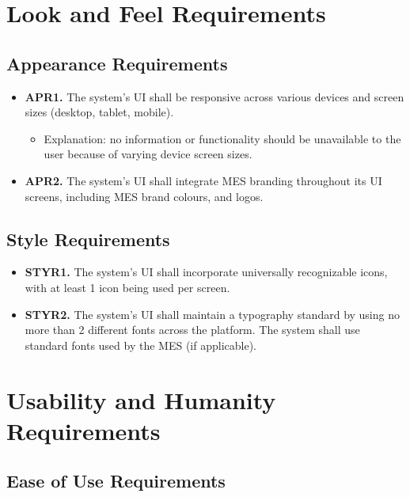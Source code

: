 \documentclass[12pt]{article}
\begin{document}
\section{Look and Feel Requirements}

\label{LookAndFeel}

\subsection{Appearance Requirements}

\label{APR}

\begin{itemize}
    \item \textbf{APR1.} The system's UI shall be responsive across various devices and screen sizes (desktop, tablet, mobile).
    \begin{itemize}
        \item Explanation: no information or functionality should be unavailable to the user because of varying device screen sizes.
    \end{itemize}
    \item \textbf{APR2.} The system's UI shall integrate MES branding throughout its UI screens, including MES brand colours, and logos.
\end{itemize}

\subsection{Style Requirements}

\label{STYR}

\begin{itemize}
    \item \textbf{STYR1.} The system's UI shall incorporate universally recognizable icons, with at least 1 icon being used per screen.
    \item \textbf{STYR2.} The system's UI shall maintain a typography standard by using no more than 2 different fonts across the platform. The system shall use standard fonts used by the MES (if applicable).
\end{itemize}

\section{Usability and Humanity Requirements}

\label{UseandHum}

\subsection{Ease of Use Requirements}
\end{document}
